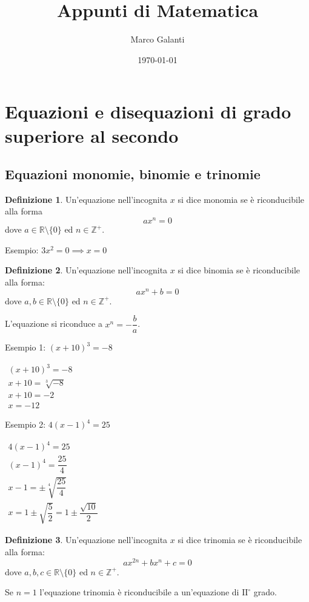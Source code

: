 \documentclass[a4paper]{article}
\title{Appunti di Matematica}
\author{Marco Galanti}
\date{\today}
\theoremstyle{plain}
\theoremstyle{definition}
\newtheorem{definizione}{Definizione}
\theoremstyle{remark}
\newcommand{\Z}{\mathbb{Z}}
\newcommand{\R}{\mathbb{R}}
\newcommand{\set}[1]{\{#1\}}
\begin{document}
\maketitle
\tableofcontents
\newpage
\section{Equazioni e disequazioni di grado superiore al secondo}
\subsection{Equazioni monomie, binomie e trinomie}
\begin{definizione}
    Un'equazione nell'incognita $x$ si dice monomia se è riconducibile alla forma
    \begin{equation}
        ax^n=0
    \end{equation}
    dove $a\in\R\setminus\set{0}$ ed $n\in\Z^+$.
\end{definizione}
Esempio: $3x^2=0\implies x=0$
\begin{definizione}
    Un'equazione nell'incognita $x$ si dice binomia se è riconducibile alla forma:
    \begin{equation}
        ax^n+b=0
    \end{equation}
    dove $a,b\in\R\setminus\set{0}$ ed $n\in\Z^+$.
\end{definizione}
L'equazione si riconduce a $x^n=-\dfrac{b}{a}$.

Esempio 1: $(x+10)^3=-8$

$\begin{array}{l}
    (x+10)^3=-8\\
    x+10=\sqrt[3]{-8}\\
    x+10=-2\\
    x=-12
\end{array}$

Esempio 2: $4(x-1)^4=25$

$\begin{array}{l}
    4(x-1)^4=25\\
    (x-1)^4=\dfrac{25}{4}\\
    x-1=\pm\sqrt[4]{\dfrac{25}{4}}\\
    x=1\pm\sqrt{\dfrac{5}{2}}=1\pm\dfrac{\sqrt{10}}{2}
\end{array}$
\begin{definizione}
    Un'equazione nell'incognita $x$ si dice trinomia se è riconducibile alla forma:
    \begin{equation}
        ax^{2n}+bx^n+c=0
    \end{equation}
    dove $a,b,c\in\R\setminus\set{0}$ ed $n\in\Z^+$.
\end{definizione}
Se $n=1$ l'equazione trinomia è riconducibile a un'equazione di $\mathrm{II}^\circ$ grado.
\end{document}
